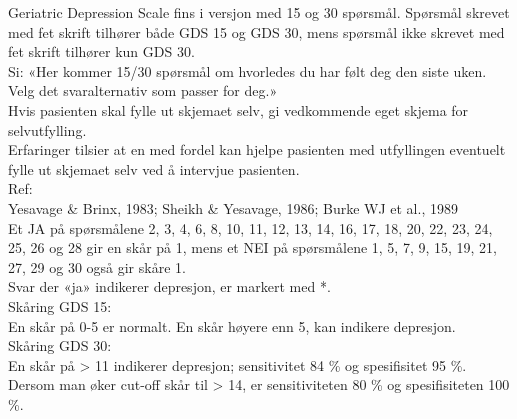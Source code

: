 \documentclass[pdf,  style=code128, globalid=OMRCRFv5.0.3, english, stamp, pagemark, oneside]{sdapsclassic}
\begin{document}
\begin{questionnaire}
\begin{tcolorbox}
\small
Geriatric Depression Scale fins i versjon med 15 og 30 spørsmål. Spørsmål skrevet med fet skrift tilhører både GDS 15 og GDS 30, mens spørsmål ikke skrevet med fet skrift tilhører kun GDS 30.\\[0.1em]
Si: «Her kommer 15/30 spørsmål om hvorledes du har følt deg den siste uken. Velg det svaralternativ som passer for deg.»\\[0.1em]

Hvis pasienten skal fylle ut skjemaet selv, gi vedkommende eget skjema for selvutfylling.\\
Erfaringer tilsier at en med fordel kan hjelpe pasienten med utfyllingen eventuelt fylle ut skjemaet selv ved å intervjue pasienten.\\[0.1em]

Ref:\\
Yesavage \& Brinx, 1983; Sheikh \& Yesavage, 1986; Burke WJ et al., 1989 \\[0.1em]

Et JA på spørsmålene 2, 3, 4, 6, 8, 10, 11, 12, 13, 14, 16, 17, 18, 20, 22, 23, 24, 25, 26 og 28 gir en skår på 1, mens et NEI på spørsmålene 1, 5, 7, 9, 15, 19, 21, 27, 29 og 30 også gir skåre 1.\\
Svar der «ja» indikerer depresjon, er markert med *.\\[0.1em]

Skåring GDS 15:\\
En skår på 0-5 er normalt. En skår høyere enn 5, kan indikere depresjon.\\
Skåring GDS 30:\\
En skår på > 11 indikerer depresjon; sensitivitet 84 \% og spesifisitet 95 \%. Dersom man øker cut-off skår til > 14, er sensitiviteten 80 \% og spesifisiteten 100 \%.
\normalsize
\end{tcolorbox}

\ExplSyntaxOn
\newcommand{\gdsrow}[3]{
    \sdaps_qobject_begin:nnn {gds_item} { Option } {#3}
    \sdaps_qobject_append_var:n {#3}
        \sdaps_checkbox_set_type:n {singlechoice}
        #1 & #2 &
    \sdaps_answer:n {#3} \sdaps_checkbox:nn {} {1}   &
        \sdaps_answer:n {#3} \sdaps_checkbox:nn {} {0}

    \sdaps_qobject_end:n {gds_item}
}
\ExplSyntaxOff


\end{questionnaire}
\end{document}
